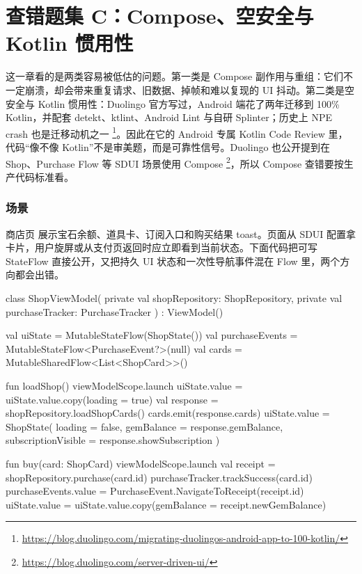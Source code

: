 \chapter{查错题集 C：Compose、空安全与 Kotlin 惯用性}

这一章看的是两类容易被低估的问题。第一类是 Compose 副作用与重组：它们不一定崩溃，却会带来重复请求、旧数据、掉帧和难以复现的 UI 抖动。第二类是空安全与 Kotlin 惯用性：Duolingo 官方写过，Android 端花了两年迁移到 100\% Kotlin，并配套 detekt、ktlint、Android Lint 与自研 Splinter；历史上 NPE crash 也是迁移动机之一 \srcofficial\footnote{\url{https://blog.duolingo.com/migrating-duolingos-android-app-to-100-kotlin/}}。因此在它的 Android 专属 Kotlin Code Review 里，代码“像不像 Kotlin”不是审美题，而是可靠性信号。Duolingo 也公开提到在 Shop、Purchase Flow 等 SDUI 场景使用 Compose \srcofficial\footnote{\url{https://blog.duolingo.com/server-driven-ui/}}，所以 Compose 查错要按生产代码标准看。


\subsection*{场景}
商店页  展示宝石余额、道具卡、订阅入口和购买结果 toast。页面从 SDUI 配置拿卡片，用户旋屏或从支付页返回时应立即看到当前状态。下面代码把可写 StateFlow 直接公开，又把持久 UI 状态和一次性导航事件混在 Flow 里，两个方向都会出错。

\begin{ktbug}
class ShopViewModel(
    private val shopRepository: ShopRepository,
    private val purchaseTracker: PurchaseTracker
) : ViewModel() {
    val uiState = MutableStateFlow(ShopState())
    val purchaseEvents = MutableStateFlow<PurchaseEvent?>(null)
    val cards = MutableSharedFlow<List<ShopCard>>()

    fun loadShop() {
        viewModelScope.launch {
            uiState.value = uiState.value.copy(loading = true)
            val response = shopRepository.loadShopCards()
            cards.emit(response.cards)
            uiState.value = ShopState(
                loading = false,
                gemBalance = response.gemBalance,
                subscriptionVisible = response.showSubscription
            )
        }
    }

    fun buy(card: ShopCard) {
        viewModelScope.launch {
            val receipt = shopRepository.purchase(card.id)
            purchaseTracker.trackSuccess(card.id)
            purchaseEvents.value = PurchaseEvent.NavigateToReceipt(receipt.id)
            uiState.value = uiState.value.copy(gemBalance = receipt.newGemBalance)
        }
    }
}
\end{ktbug}

